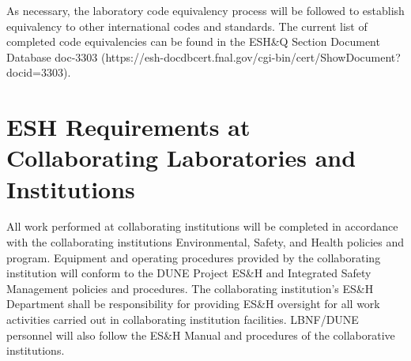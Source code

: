 As necessary, the laboratory code equivalency process will be followed
to establish equivalency to other international codes and
standards. The current list of completed code equivalencies can be
found in the ESH\&Q Section Document Database doc-3303
(https://esh-docdbcert.fnal.gov/cgi-bin/cert/ShowDocument?docid=3303).

\section{ESH Requirements at Collaborating Laboratories and Institutions}

All work performed at collaborating institutions will be completed in
accordance with the collaborating institutions Environmental, Safety,
and Health policies and program. Equipment and operating procedures
provided by the collaborating institution will conform to the DUNE
Project ES\&H and Integrated Safety Management policies and
procedures. The collaborating institution's ES\&H Department shall be
responsibility for providing ES\&H oversight for all work activities
carried out in collaborating institution facilities. LBNF/DUNE
personnel will also follow the ES\&H Manual and procedures of the
collaborative institutions.
